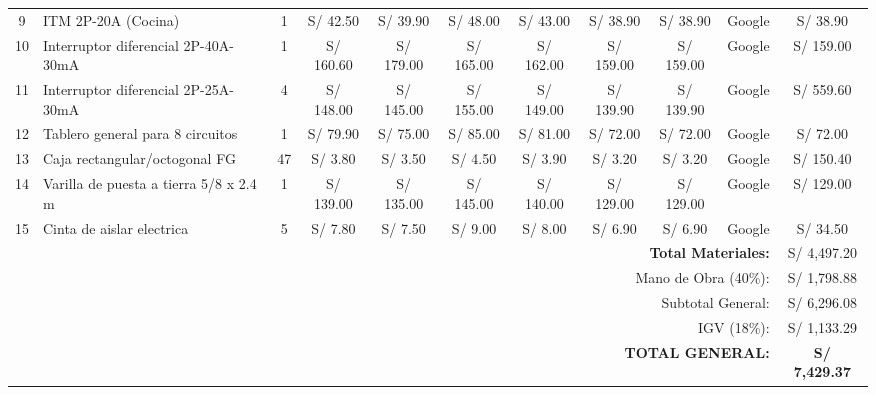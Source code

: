 \documentclass[11pt,a4paper]{article}
\begin{document}
\begin{landscape}
\begin{table}[H]
\begin{scriptsize}
\begin{tabularx}{1.38\textwidth}{c X c c c c c c c c c}
9 & ITM 2P-20A (Cocina) & 1 & S/ 42.50 & S/ 39.90 & S/ 48.00 & S/ 43.00 & S/ 38.90 & S/ 38.90 & Google & S/ 38.90 \\
10 & Interruptor diferencial 2P-40A-30mA & 1 & S/ 160.60 & S/ 179.00 & S/ 165.00 & S/ 162.00 & S/ 159.00 & S/ 159.00 & Google & S/ 159.00 \\
11 & Interruptor diferencial 2P-25A-30mA & 4 & S/ 148.00 & S/ 145.00 & S/ 155.00 & S/ 149.00 & S/ 139.90 & S/ 139.90 & Google & S/ 559.60 \\
12 & Tablero general para 8 circuitos & 1 & S/ 79.90 & S/ 75.00 & S/ 85.00 & S/ 81.00 & S/ 72.00 & S/ 72.00 & Google & S/ 72.00 \\
13 & Caja rectangular/octogonal FG & 47 & S/ 3.80 & S/ 3.50 & S/ 4.50 & S/ 3.90 & S/ 3.20 & S/ 3.20 & Google & S/ 150.40 \\
14 & Varilla de puesta a tierra 5/8 x 2.4 m & 1 & S/ 139.00 & S/ 135.00 & S/ 145.00 & S/ 140.00 & S/ 129.00 & S/ 129.00 & Google & S/ 129.00 \\
15 & Cinta de aislar electrica & 5 & S/ 7.80 & S/ 7.50 & S/ 9.00 & S/ 8.00 & S/ 6.90 & S/ 6.90 & Google & S/ 34.50 \\
\midrule
\multicolumn{10}{r}{\textbf{Total Materiales:}} & S/ 4,497.20 \\
\multicolumn{10}{r}{Mano de Obra (40\%):} & S/ 1,798.88 \\
\multicolumn{10}{r}{Subtotal General:} & S/ 6,296.08 \\
\multicolumn{10}{r}{IGV (18\%):} & S/ 1,133.29 \\
\multicolumn{10}{r}{\textbf{TOTAL GENERAL:}} & \textbf{S/ 7,429.37} \\
\bottomrule
\end{tabularx}
\end{scriptsize}
\end{table}
\end{landscape}
\end{document}
